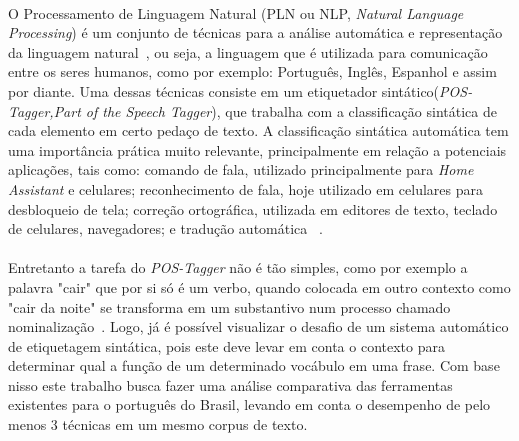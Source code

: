 \paragraph{}O Processamento de Linguagem Natural (PLN ou NLP, \textit{Natural Language Processing}) é um conjunto de técnicas para a análise automática e representação da linguagem natural~\cite{Cambria2014}, ou seja, a linguagem que é utilizada para comunicação entre os seres humanos, como por exemplo: Português, Inglês, Espanhol e assim por diante. Uma dessas técnicas consiste em um etiquetador sintático(\textit{POS-Tagger,Part of the Speech Tagger}), que trabalha com a classificação sintática de cada elemento em certo pedaço de texto. A classificação sintática automática tem uma importância prática muito relevante, principalmente em relação a potenciais aplicações, tais como: comando de fala, utilizado principalmente para \textit{Home Assistant} e celulares; reconhecimento de fala, hoje utilizado em celulares para desbloqueio de tela; correção ortográfica, utilizada em editores de texto, teclado de celulares, navegadores; e tradução automática ~\cite{Church1988}. 
\paragraph{}Entretanto a tarefa do \textit{POS-Tagger} não é tão simples, como por exemplo a palavra "cair" que por si só é um verbo, quando colocada em outro contexto como "cair da noite" se transforma em um substantivo num processo chamado nominalização~\cite{Rocha1999}. Logo, já é possível visualizar o desafio de um sistema automático de etiquetagem sintática, pois este deve levar em conta o contexto para determinar qual a função de um determinado vocábulo em uma frase.  Com base nisso este trabalho busca fazer uma análise comparativa das ferramentas existentes para o português do Brasil, levando em conta o desempenho de pelo menos 3 técnicas em um mesmo corpus de texto.
